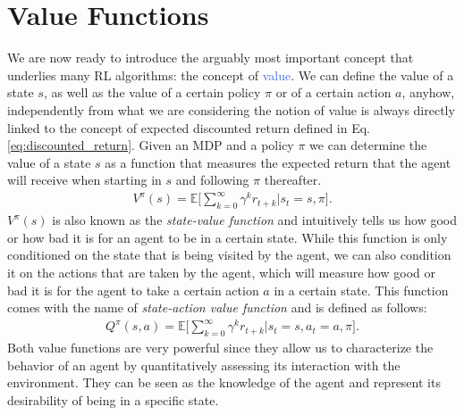 \section{Value Functions}
We are now ready to introduce the arguably most important concept that underlies many RL algorithms: the concept of \textcolor{RoyalBlue}{value}. We can define the value of a state $s$, as well as the value of a certain policy $\pi$ or of a certain action $a$, anyhow, independently from what we are considering the notion of value is always directly linked to the concept of expected discounted return defined in Eq. \ref{eq:discounted_return}. Given an MDP and a policy $\pi$ we can determine the value of a state $s$ as a function that measures the expected return that the agent will receive when starting in $s$ and following $\pi$ thereafter. 
\begin{align}
    V^{\pi}(s)=\mathds{E}\bigg[\sum_{k=0}^{\infty}\gamma^{k}r_{t+k}\bigg| s_t = s, \pi \bigg].
    \label{eq:state_value_function}
\end{align}
$V^{\pi}(s)$ is also known as the \textit{state-value function} and intuitively tells us how good or how bad it is for an agent to be in a certain state. While this function is only conditioned on the state that is being visited by the agent, we can also condition it on the actions that are taken by the agent, which will measure how good or bad it is for the agent to take a certain action $a$ in a certain state. This function comes with the name of \textit{state-action value function} and is defined as follows:
\begin{align}
     Q^{\pi}(s,a)=\mathds{E}\bigg[\sum_{k=0}^{\infty}\gamma^{k}r_{t+k} \bigg| s_t = s, a_t=a, \pi\bigg].
 \end{align}
Both value functions are very powerful since they allow us to characterize the behavior of an agent by quantitatively assessing its interaction with the environment. They can be seen as the knowledge of the agent and represent its desirability of being in a specific state.   

